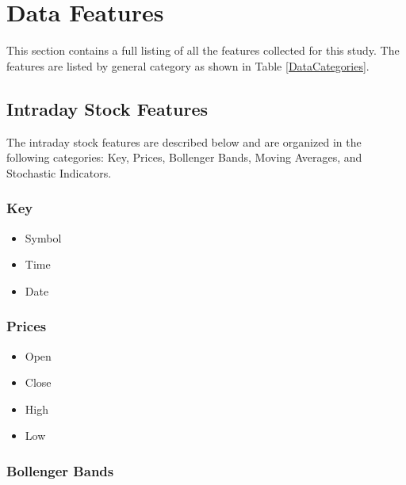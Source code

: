 \documentclass[journal]{IEEEtran}
\begin{document}
\appendices

\section{Data Features}
\label{DataFeatures}

This section contains a full listing of all the features collected for this
 study. The features are listed by general category as shown in 
 Table \ref{DataCategories}.

\subsection{Intraday Stock Features}

The intraday stock features are described below and are organized in the 
 following categories: Key, Prices, Bollenger Bands, Moving Averages, and Stochastic 
 Indicators.

\subsubsection{Key}

\begin{itemize}
	\item Symbol
	\item Time
	\item Date
\end{itemize}

\subsubsection{Prices}

\begin{itemize}
	\item Open
	\item Close
	\item High
	\item Low
\end{itemize}

\subsubsection{Bollenger Bands}
\end{document}
